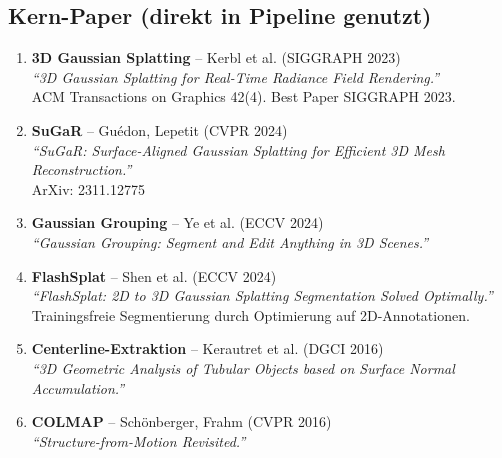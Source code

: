 \documentclass[11pt, a4paper]{article}
\begin{document}
\subsection{Kern-Paper (direkt in Pipeline genutzt)}
\begin{enumerate}[noitemsep]
    \item \textbf{3D Gaussian Splatting} -- Kerbl et al. (SIGGRAPH 2023)\\
    \textit{``3D Gaussian Splatting for Real-Time Radiance Field Rendering.''}\\
    ACM Transactions on Graphics 42(4). Best Paper SIGGRAPH 2023.

    \item \textbf{SuGaR} -- Gu\'edon, Lepetit (CVPR 2024)\\
    \textit{``SuGaR: Surface-Aligned Gaussian Splatting for Efficient 3D Mesh Reconstruction.''}\\
    ArXiv: 2311.12775

    \item \textbf{Gaussian Grouping} -- Ye et al. (ECCV 2024)\\
    \textit{``Gaussian Grouping: Segment and Edit Anything in 3D Scenes.''}

    \item \textbf{FlashSplat} -- Shen et al. (ECCV 2024)\\
    \textit{``FlashSplat: 2D to 3D Gaussian Splatting Segmentation Solved Optimally.''}\\
    Trainingsfreie Segmentierung durch Optimierung auf 2D-Annotationen.

    \item \textbf{Centerline-Extraktion} -- Kerautret et al. (DGCI 2016)\\
    \textit{``3D Geometric Analysis of Tubular Objects based on Surface Normal Accumulation.''}

    \item \textbf{COLMAP} -- Sch\"onberger, Frahm (CVPR 2016)\\
    \textit{``Structure-from-Motion Revisited.''}
\end{enumerate}
\end{document}
